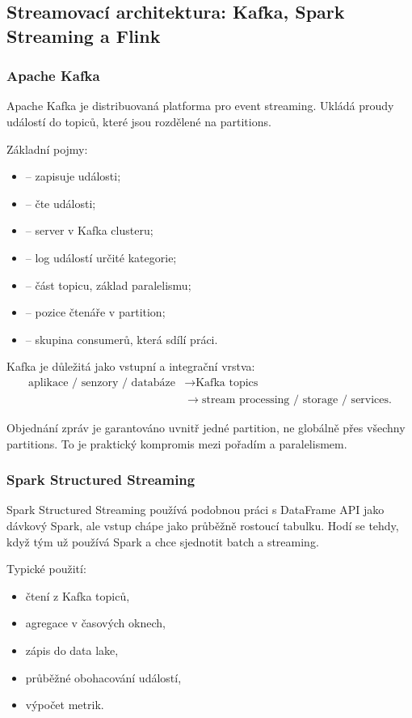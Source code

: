 \subsection{Streamovací architektura: Kafka, Spark Streaming a Flink}

\subsubsection{Apache Kafka}

Apache Kafka je distribuovaná platforma pro event streaming. Ukládá proudy událostí do topiců, které jsou
rozdělené na partitions.

Základní pojmy:
\begin{itemize}
    \item {} -- zapisuje události;
    \item {} -- čte události;
    \item {} -- server v Kafka clusteru;
    \item {} -- log událostí určité kategorie;
    \item {} -- část topicu, základ paralelismu;
    \item {} -- pozice čtenáře v partition;
    \item {} -- skupina consumerů, která sdílí práci.
\end{itemize}

Kafka je důležitá jako vstupní a integrační vrstva:
\[
\begin{aligned}
\text{aplikace / senzory / databáze}
&\rightarrow
\text{Kafka topics}\\
&\rightarrow
\text{stream processing / storage / services}.
\end{aligned}
\]

Objednání zpráv je garantováno uvnitř jedné partition, ne globálně přes všechny partitions. To je
praktický kompromis mezi pořadím a paralelismem.

\subsubsection{Spark Structured Streaming}

Spark Structured Streaming používá podobnou práci s DataFrame API jako dávkový Spark, ale vstup chápe jako
průběžně rostoucí tabulku. Hodí se tehdy, když tým už používá Spark a chce sjednotit batch a streaming.

Typické použití:
\begin{itemize}
    \item čtení z Kafka topiců,
    \item agregace v časových oknech,
    \item zápis do data lake,
    \item průběžné obohacování událostí,
    \item výpočet metrik.
\end{itemize}


